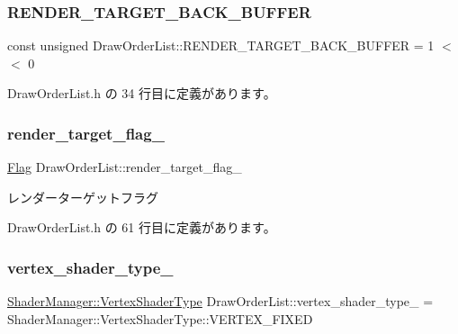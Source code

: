 \subsubsection{\texorpdfstring{R\+E\+N\+D\+E\+R\+\_\+\+T\+A\+R\+G\+E\+T\+\_\+\+B\+A\+C\+K\+\_\+\+B\+U\+F\+F\+ER}{RENDER\_TARGET\_BACK\_BUFFER}}
{\footnotesize\ttfamily const unsigned Draw\+Order\+List\+::\+R\+E\+N\+D\+E\+R\+\_\+\+T\+A\+R\+G\+E\+T\+\_\+\+B\+A\+C\+K\+\_\+\+B\+U\+F\+F\+ER = 1 $<$$<$ 0\hspace{0.3cm}{\ttfamily [static]}}



 Draw\+Order\+List.\+h の 34 行目に定義があります。

\mbox{\label{class_draw_order_list_a8da2b635d5b2a9191088f9180d1fe6d6}} 
\subsubsection{\texorpdfstring{render\+\_\+target\+\_\+flag\+\_\+}{render\_target\_flag\_}}
{\footnotesize\ttfamily \mbox{\hyperlink{class_flag}{Flag}} Draw\+Order\+List\+::render\+\_\+target\+\_\+flag\+\_\+\hspace{0.3cm}{\ttfamily [private]}}



レンダーターゲットフラグ 



 Draw\+Order\+List.\+h の 61 行目に定義があります。

\mbox{\label{class_draw_order_list_afcb0968108f4e6932358393a8bc90a8b}} 
\subsubsection{\texorpdfstring{vertex\+\_\+shader\+\_\+type\+\_\+}{vertex\_shader\_type\_}}
{\footnotesize\ttfamily \mbox{\hyperlink{class_shader_manager_a9b51e49d70eb3cc58f6d1f3994e8cfbd}{Shader\+Manager\+::\+Vertex\+Shader\+Type}} Draw\+Order\+List\+::vertex\+\_\+shader\+\_\+type\+\_\+ = Shader\+Manager\+::\+Vertex\+Shader\+Type\+::\+V\+E\+R\+T\+E\+X\+\_\+\+F\+I\+X\+ED\hspace{0.3cm}{\ttfamily [private]}}



